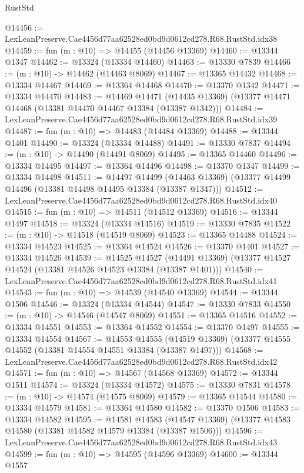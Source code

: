 \begin{lexlean}{RustStd}
\begin{coremodule}
@14456 := LexLeanPreserve.Cae4456d77aa62528ed0bd9d0612cd278.R68.RustStd.idx38
@14459 := fun (m : @10) => @14455 (@14456 @13369)
@14460 := @13344 @1347
@14462 := @13324 (@13334 @14460)
@14463 := @13330 @7839
@14466 := (m : @10) -> @14462 (@14463 @8069)
@14467 := @13365 @14432
@14468 := @13334 @14467
@14469 := @13364 @14468
@14470 := @13370 @1342
@14471 := @13334 @14470
@14483 := @14469
    @14471
    (@14435 @13369)
    (@13377 @14471 @14468 (@13381 @14470 @14467 @13384 (@13387 @1342)))
@14484 := LexLeanPreserve.Cae4456d77aa62528ed0bd9d0612cd278.R68.RustStd.idx39
@14487 := fun (m : @10) => @14483 (@14484 @13369)
@14488 := @13344 @1401
@14490 := @13324 (@13334 @14488)
@14491 := @13330 @7837
@14494 := (m : @10) -> @14490 (@14491 @8069)
@14495 := @13365 @14460
@14496 := @13334 @14495
@14497 := @13364 @14496
@14498 := @13370 @1347
@14499 := @13334 @14498
@14511 := @14497
    @14499
    (@14463 @13369)
    (@13377 @14499 @14496 (@13381 @14498 @14495 @13384 (@13387 @1347)))
@14512 := LexLeanPreserve.Cae4456d77aa62528ed0bd9d0612cd278.R68.RustStd.idx40
@14515 := fun (m : @10) => @14511 (@14512 @13369)
@14516 := @13344 @1497
@14518 := @13324 (@13334 @14516)
@14519 := @13330 @7835
@14522 := (m : @10) -> @14518 (@14519 @8069)
@14523 := @13365 @14488
@14524 := @13334 @14523
@14525 := @13364 @14524
@14526 := @13370 @1401
@14527 := @13334 @14526
@14539 := @14525
    @14527
    (@14491 @13369)
    (@13377 @14527 @14524 (@13381 @14526 @14523 @13384 (@13387 @1401)))
@14540 := LexLeanPreserve.Cae4456d77aa62528ed0bd9d0612cd278.R68.RustStd.idx41
@14543 := fun (m : @10) => @14539 (@14540 @13369)
@14544 := @13344 @1506
@14546 := @13324 (@13334 @14544)
@14547 := @13330 @7833
@14550 := (m : @10) -> @14546 (@14547 @8069)
@14551 := @13365 @14516
@14552 := @13334 @14551
@14553 := @13364 @14552
@14554 := @13370 @1497
@14555 := @13334 @14554
@14567 := @14553
    @14555
    (@14519 @13369)
    (@13377 @14555 @14552 (@13381 @14554 @14551 @13384 (@13387 @1497)))
@14568 := LexLeanPreserve.Cae4456d77aa62528ed0bd9d0612cd278.R68.RustStd.idx42
@14571 := fun (m : @10) => @14567 (@14568 @13369)
@14572 := @13344 @1511
@14574 := @13324 (@13334 @14572)
@14575 := @13330 @7831
@14578 := (m : @10) -> @14574 (@14575 @8069)
@14579 := @13365 @14544
@14580 := @13334 @14579
@14581 := @13364 @14580
@14582 := @13370 @1506
@14583 := @13334 @14582
@14595 := @14581
    @14583
    (@14547 @13369)
    (@13377 @14583 @14580 (@13381 @14582 @14579 @13384 (@13387 @1506)))
@14596 := LexLeanPreserve.Cae4456d77aa62528ed0bd9d0612cd278.R68.RustStd.idx43
@14599 := fun (m : @10) => @14595 (@14596 @13369)
@14600 := @13344 @1557

\end{coremodule}
\end{lexlean}
